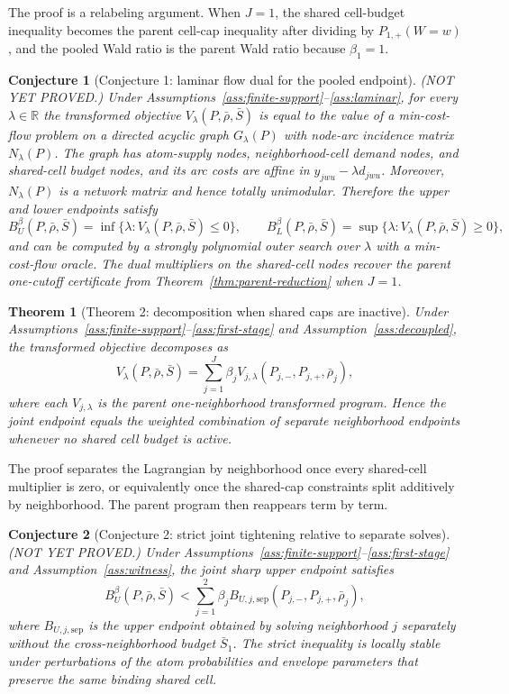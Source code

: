 \documentclass[11pt]{article}
\newcommand{\R}{\mathbb{R}}
\theoremstyle{definition}
\theoremstyle{plain}
\newtheorem{theorem}{Theorem}
\newtheorem{conjecture}{Conjecture}
\theoremstyle{remark}
\begin{document}
The proof is a relabeling argument. When \(J=1\), the shared cell-budget inequality becomes the
parent cell-cap inequality after dividing by \(P_{1,+}(W=w)\), and the pooled Wald ratio is the
parent Wald ratio because \(\beta_1=1\).

\begin{conjecture}[Conjecture 1: laminar flow dual for the pooled endpoint]\label{conj:flow-dual}
(NOT YET PROVED.) Under Assumptions~\ref{ass:finite-support}--\ref{ass:laminar}, for every
\(\lambda\in\R\) the transformed objective \(V_\lambda(P,\bar\rho,\bar S)\) is equal to the value
of a min-cost-flow problem on a directed acyclic graph \(G_\lambda(P)\) with node-arc incidence
matrix \(N_\lambda(P)\). The graph has atom-supply nodes, neighborhood-cell demand nodes, and
shared-cell budget nodes, and its arc costs are affine in \(y_{jwu}-\lambda d_{jwu}\). Moreover,
\(N_\lambda(P)\) is a network matrix and hence totally unimodular. Therefore the upper and lower
endpoints satisfy
\[
  B_U^\beta(P,\bar\rho,\bar S)=\inf\{\lambda:V_\lambda(P,\bar\rho,\bar S)\le 0\},
  \qquad
  B_L^\beta(P,\bar\rho,\bar S)=\sup\{\lambda:V_\lambda(P,\bar\rho,\bar S)\ge 0\},
\]
and can be computed by a strongly polynomial outer search over \(\lambda\) with a min-cost-flow
oracle. The dual multipliers on the shared-cell nodes recover the parent one-cutoff certificate
from Theorem~\ref{thm:parent-reduction} when \(J=1\).
\end{conjecture}

\begin{theorem}[Theorem 2: decomposition when shared caps are inactive]\label{thm:decompose}
Under Assumptions~\ref{ass:finite-support}--\ref{ass:first-stage} and
Assumption~\ref{ass:decoupled}, the transformed objective decomposes as
\[
  V_\lambda(P,\bar\rho,\bar S)
  =
  \sum_{j=1}^J \beta_j V_{j,\lambda}(P_{j,-},P_{j,+},\bar\rho_j),
\]
where each \(V_{j,\lambda}\) is the parent one-neighborhood transformed program. Hence the joint
endpoint equals the weighted combination of separate neighborhood endpoints whenever no shared
cell budget is active.
\end{theorem}

The proof separates the Lagrangian by neighborhood once every shared-cell multiplier is zero, or
equivalently once the shared-cap constraints split additively by neighborhood. The parent program
then reappears term by term.

\begin{conjecture}[Conjecture 2: strict joint tightening relative to separate solves]\label{conj:strict}
(NOT YET PROVED.) Under Assumptions~\ref{ass:finite-support}--\ref{ass:first-stage} and
Assumption~\ref{ass:witness}, the joint sharp upper endpoint satisfies
\[
  B_U^\beta(P,\bar\rho,\bar S)
  <
  \sum_{j=1}^2 \beta_j B_{U,j,\mathrm{sep}}(P_{j,-},P_{j,+},\bar\rho_j),
\]
where \(B_{U,j,\mathrm{sep}}\) is the upper endpoint obtained by solving neighborhood \(j\)
separately without the cross-neighborhood budget \(\bar S_1\). The strict inequality is locally
stable under perturbations of the atom probabilities and envelope parameters that preserve the
same binding shared cell.
\end{conjecture}
\end{document}
